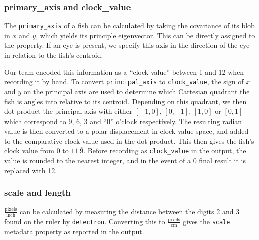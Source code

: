 \documentclass[screen,review]{acmart}
\begin{document}
\subsubsection{primary\_axis and clock\_value}
The \verb|primary_axis| of a fish can be calculated by taking the covariance of its blob in \(x\) and \(y\), which yields its principle eigenvector. This can be directly assigned to the property. If an eye is present, we specify this axis in the direction of the eye in relation to the fish's centroid.

Our team encoded this information as a ``clock value'' between 1 and 12 when recording it by hand. To convert \verb|principal_axis| to \verb|clock_value|, the sign of \(x\) and \(y\) on the principal axis are used to determine which Cartesian quadrant the fish is angles into relative to its centroid. Depending on this quadrant, we then dot product the principal axis with either \([-1,0]\), \([0,-1]\), \([1,0]\) or \([0,1]\) which correspond to 9, 6, 3 and ``0'' o'clock respectively. The resulting radian value is then converted to a polar displacement in clock value space, and added to the comparative clock value used in the dot product. This then gives the fish's clock value from 0 to \(11.\overline{9}\). Before recording as \verb|clock_value| in the output, the value is rounded to the nearest integer, and in the event of a 0 final result it is replaced with 12.
\subsubsection{scale and length}
\(\frac{\mathrm{pixels}}{\mathrm{inch}}\) can be calculated by measuring the distance between the digits 2 and 3 found on the ruler by \verb|detectron|. Converting this to \(\frac{\mathrm{pixels}}{\mathrm{cm}}\) gives the \verb|scale| metadata property as reported in the output.
\end{document}
